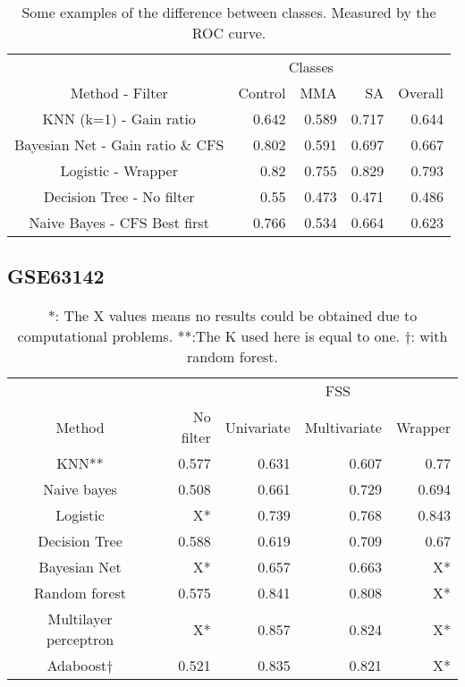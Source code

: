 \documentclass[conference,a4paper]{IEEEtran}
\begin{document}
\begin{table}[h]
	\caption{Some examples of the difference between classes. Measured by the ROC curve.}
	\centering
	\begin{tabular}{c r r r r}
		\hline\hline
		& \multicolumn{3}{c|}{Classes} & \\
		Method - Filter & Control & MMA & SA & \multicolumn{1}{|c}{Overall}\\ [0.2ex]
		\hline 
		KNN (k=1) - Gain ratio & 0.642 & 0.589 & 0.717 & 0.644 \\
		Bayesian Net - Gain ratio \& CFS & 0.802 & 0.591 & 0.697 & 0.667 \\
		Logistic - Wrapper & 0.82 & 0.755 & 0.829 & 0.793 \\
		Decision Tree - No filter & 0.55 & 0.473 & 0.471 & 0.486\\
		Naive Bayes - CFS Best first & 0.766 & 0.534 & 0.664 & 0.623 \\ [1ex]
		\hline
	\end{tabular}
	\label{table:inClassResults}
\end{table}

\subsection{GSE63142}

\begin{table}[h]
	\caption{*: The X values means no results could be obtained due to computational problems. **:The K used here is equal to one. $\dagger$: with random forest.}
	\centering
	\begin{tabular}{c r r r r}
		\hline\hline
		& & \multicolumn{3}{|c}{FSS} \\
		Method & No filter & \multicolumn{1}{|c}{Univariate} & Multivariate & Wrapper\\ [0.2ex]
		\hline
		KNN** & 0.577 & 0.631 & 0.607 & 0.77 \\
		Naive bayes & 0.508 & 0.661 & 0.729 & 0.694 \\
		Logistic &  X* & 0.739 & 0.768 & 0.843\\
		Decision Tree & 0.588 & 0.619 & 0.709 & 0.67\\
		Bayesian Net & X* & 0.657 & 0.663 & X* \\
		Random forest & 0.575 & 0.841 & 0.808 & X*\\
		Multilayer perceptron & X* & 0.857 & 0.824 & X*\\
		Adaboost$\dagger$ & 0.521 & 0.835 & 0.821 & X*\\ [1ex]
		\hline
	\end{tabular}
	\label{table:basicsResults63142}
\end{table}
\end{document}
